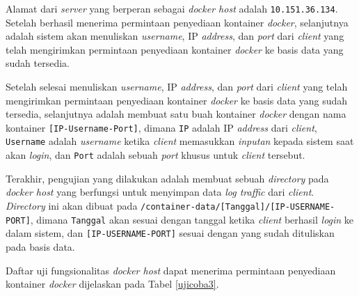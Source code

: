Alamat dari \textit{server} yang berperan sebagai \textit{docker host} adalah \texttt{10.151.36.134}. Setelah berhasil menerima permintaan penyediaan kontainer \textit{docker}, selanjutnya adalah sistem akan menuliskan \textit{username}, IP \textit{address}, dan \textit{port} dari \textit{client} yang telah mengirimkan permintaan penyediaan kontainer \textit{docker} ke basis data yang sudah tersedia.

Setelah selesai menuliskan \textit{username}, IP \textit{address}, dan \textit{port} dari \textit{client} yang telah mengirimkan permintaan penyediaan kontainer \textit{docker} ke basis data yang sudah tersedia, selanjutnya adalah membuat satu buah kontainer \textit{docker} dengan nama kontainer \texttt{[IP-Username-Port]}, dimana \texttt{IP} adalah IP \textit{address} dari \textit{client}, \texttt{Username} adalah \textit{username} ketika \textit{client} memasukkan \textit{inputan} kepada sistem saat akan \textit{login}, dan \texttt{Port} adalah sebuah \textit{port} khusus untuk \textit{client} tersebut.

Terakhir, pengujian yang dilakukan adalah membuat sebuah \textit{directory} pada \textit{docker host} yang berfungsi untuk menyimpan data \textit{log traffic} dari \textit{client}. \textit{Directory} ini akan dibuat pada \texttt{/container-data/[Tanggal]/[IP-USERNAME-PORT]}, dimana \texttt{Tanggal} akan sesuai dengan tanggal ketika \textit{client} berhasil \textit{login} ke dalam sistem, dan \texttt{[IP-USERNAME-PORT]} sesuai dengan yang sudah dituliskan pada basis data.

Daftar uji fungsionalitas \textit{docker host} dapat menerima permintaan penyediaan kontainer \textit{docker} dijelaskan pada Tabel \ref{ujicoba3}.

